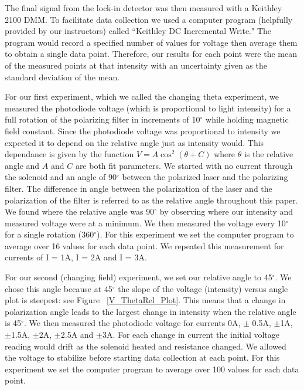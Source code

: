 \documentclass[prb,preprint]{revtex4-1}
\begin{document}
The final signal from the lock-in detector was then measured with a Keithley 2100 DMM. To facilitate data collection we used a computer program (helpfully provided by our instructors) called ``Keithley DC Incremental Write."  The program would record a specified number of values for voltage then average them to obtain a single data point. Therefore, our results for each point were the mean of the measured points at that intensity with an uncertainty given as the standard deviation of the mean. 


For our first experiment, which we called the changing theta experiment, we measured the photodiode voltage (which is proportional to light intensity) for a full rotation of the polarizing filter in increments of 10$^{\circ}$ while holding magnetic field constant. Since the photodiode voltage was proportional to intensity we expected it to depend on the relative angle just as intensity would. This dependance is given by the function $V = A \cos^{2} (\theta + C)$ where $\theta$ is the relative angle and $A$ and $C$ are both fit parameters. We started with no current through the solenoid and an angle of 90$^{\circ}$ between the polarized laser and the polarizing filter. The difference in angle between the polarization of the laser and the polarization of the filter is referred to as the relative angle throughout this paper. We found where the relative angle was 90$^{\circ}$ by observing where our intensity and measured voltage were at a minimum. We then measured the voltage every 10$^{\circ}$ for a single rotation (360$^{\circ}$). For this experiment we set the computer program to average over 16 values for each data point. We repeated this measurement for currents of I = 1A, I = 2A and I = 3A. 


For our second (changing field) experiment, we set our relative angle to 45$^{\circ}$. We chose this angle because at 45$^{\circ}$ the slope of the voltage (intensity) versus angle plot is steepest: see Figure ~\ref{V_ThetaRel_Plot}. This means that a change in polarization angle leads to the largest change in intensity when the relative angle is 45$^{\circ}$. We then measured the photodiode voltage for currents 0A, $\pm$ 0.5A, $\pm$1A, $\pm$1.5A, $\pm$2A, $\pm$2.5A and $\pm$3A. For each change in current the initial voltage reading would drift as the solenoid heated and resistance changed. We allowed the voltage to stabilize before starting data collection at each point. For this experiment we set the computer program to average over 100 values for each data point.
\end{document}
